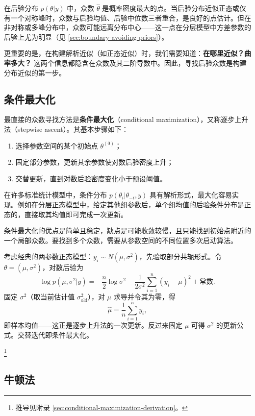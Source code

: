 在后验分布 $p(\theta|y)$ 中，众数 $\hat{\theta}$ 是概率密度最大的点。当后验分布近似正态或仅有一个对称峰时，众数与后验均值、后验中位数三者重合，是良好的点估计。但在非对称或多峰分布中，众数可能远离分布中心——这一点在分层模型中方差参数的后验上尤为明显（见 \cref{sec:boundary-avoiding-priors}）。

更重要的是，在构建解析近似（如正态近似）时，我们需要知道：\textbf{在哪里近似？曲率多大？} 这两个信息都隐含在众数及其二阶导数中。因此，寻找后验众数是构建分布近似的第一步。

\subsection{条件最大化}\label{sec:conditional-maximization}

最直接的众数寻找方法是\textbf{条件最大化}（conditional maximization），又称逐步上升法（stepwise ascent）。其基本步骤如下：

\begin{enumerate}
\item 选择参数空间的某个初始点 $\theta^{(0)}$；
\item 固定部分参数，更新其余参数使对数后验密度上升；
\item 交替更新，直到对数后验密度变化小于预设阈值。
\end{enumerate}

在许多标准统计模型中，条件分布 $p(\theta_i | \theta_{-i}, y)$ 具有解析形式，最大化容易实现。例如在分层正态模型中，给定其他组参数后，单个组均值的后验条件分布是正态的，直接取其均值即可完成一次更新。

条件最大化的优点是简单且稳定，缺点是可能收敛较慢，且只能找到初始点附近的一个局部众数。要找到多个众数，需要从参数空间的不同位置多次启动算法。

\begin{Example}\label{ex:conditional-maximization}
考虑经典的两参数正态模型：$y_i \sim N(\mu, \sigma^2)$，先验取部分共轭形式。令 $\theta = (\mu, \sigma^2)$，对数后验为
\[
\log p(\mu, \sigma^2 | y) = -\frac{n}{2}\log\sigma^2 - \frac{1}{2\sigma^2}\sum_{i=1}^n (y_i - \mu)^2 + \text{常数}.
\]
固定 $\sigma^2$（取当前估计值 $\sigma_{\text{old}}^2$），对 $\mu$ 求导并令其为零，得
\[
\hat{\mu} = \frac{1}{n}\sum_{i=1}^n y_i,
\]
即样本均值——这正是逐步上升法的一次更新。反过来固定 $\mu$ 可得 $\sigma^2$ 的更新公式。交替迭代即条件最大化。
\end{Example}\footnote{推导见附录 \cref{sec:conditional-maximization-derivation}。}

\subsection{牛顿法}\label{sec:newtons-method}

